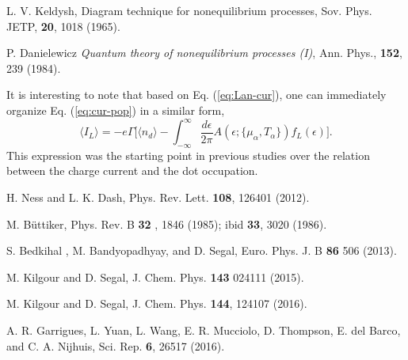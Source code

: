 \documentclass[aps,pra,twocolumn,groupedaddress,showpacs,superscriptaddress,amssymb,amsmath]{revtex4-1}
\newcommand{\be}{\begin{equation}}
\newcommand{\ee}{\end{equation}}
\begin{document}
\begin{thebibliography}{0}
 L. V. Keldysh, Diagram technique for nonequilibrium processes,
Sov. Phys. JETP,  {\bf 20}, 1018 (1965).

 P. Danielewicz 
{\it Quantum theory of nonequilibrium processes (I)}, Ann. Phys.,  {\bf 152}, 239 (1984).

It is interesting to note that based on Eq. (\ref{eq:Lan-cur}), one can immediately organize Eq. (\ref{eq:cur-pop}) in a similar form,
%
\be
\langle I_L \rangle =-e \Gamma \Big[\langle n_d\rangle - \int_{-\infty}^{\infty} \frac{d\epsilon}{2\pi }   A(\epsilon; \{\mu_{\alpha},T_{\alpha}\})  f_L(\epsilon) \Big].
\label{eq:cur-pop2}
\ee
This expression was the starting point in previous studies \cite{Ness} over the relation between the charge current and the dot occupation.




H. Ness and L. K. Dash, Phys. Rev. Lett. {\bf  108}, 126401 (2012).

M. B\"uttiker, Phys. Rev. B {\bf 32} , 1846 (1985); ibid  {\bf 33}, 3020 (1986).

S. Bedkihal , M. Bandyopadhyay, and D. Segal,
Euro. Phys. J. B {\bf 86} 506 (2013).


M. Kilgour and D. Segal,
J. Chem. Phys. {\bf 143} 024111 (2015).

M. Kilgour and D. Segal,
J. Chem. Phys. {\bf 144}, 124107 (2016). 

A. R. Garrigues, L. Yuan,
L. Wang, E. R. Mucciolo, D. Thompson, E. del Barco, and C. A. Nijhuis,
Sci. Rep. {\bf 6}, 26517 (2016). %




\end{thebibliography}
\end{document}
